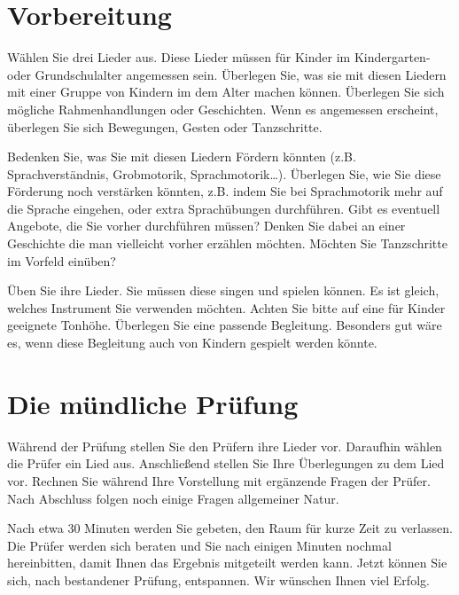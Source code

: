 \documentclass[10pt,a4paper,twoside]{report}
\begin{document}
\section{Vorbereitung}
Wählen Sie drei Lieder aus. Diese Lieder müssen für Kinder im 
Kindergarten- oder Grundschulalter angemessen sein. Überlegen Sie, was sie mit diesen Liedern
mit einer Gruppe von Kindern im dem Alter machen können. Überlegen Sie
sich mögliche Rahmenhandlungen oder Geschichten. Wenn es angemessen 
erscheint, überlegen Sie sich Bewegungen, Gesten oder Tanzschritte.

Bedenken Sie, was Sie mit diesen Liedern Fördern könnten (z.B. Sprachverständnis, 
Grobmotorik, Sprachmotorik\ldots). Überlegen Sie, wie Sie diese Förderung noch 
verstärken könnten, z.B. indem Sie bei Sprachmotorik mehr auf die Sprache eingehen,
oder extra Sprachübungen durchführen. Gibt es eventuell Angebote, die Sie vorher
durchführen müssen? Denken Sie dabei an einer Geschichte die man vielleicht vorher
erzählen möchten. Möchten Sie Tanzschritte im Vorfeld einüben?

Üben Sie ihre Lieder. Sie müssen diese singen und spielen können. Es ist gleich, welches
Instrument Sie verwenden möchten. Achten Sie bitte auf eine für Kinder geeignete Tonhöhe.
Überlegen Sie eine passende Begleitung. Besonders gut wäre es, wenn diese Begleitung auch von
Kindern gespielt werden könnte.

\section{Die mündliche Prüfung}
Während der Prüfung stellen Sie den Prüfern ihre Lieder vor. Daraufhin wählen die Prüfer
ein Lied aus. Anschließend stellen Sie Ihre Überlegungen zu dem Lied vor. Rechnen Sie 
während Ihre Vorstellung mit ergänzende Fragen der Prüfer. Nach Abschluss folgen noch einige 
Fragen allgemeiner Natur.

Nach etwa 30 Minuten werden Sie gebeten, den Raum für kurze Zeit zu verlassen. Die Prüfer
werden sich beraten und Sie nach einigen Minuten nochmal hereinbitten, damit Ihnen das 
Ergebnis mitgeteilt werden kann. Jetzt können Sie sich, nach bestandener Prüfung, entspannen.
Wir wünschen Ihnen viel Erfolg.

%
%
\end{document}
